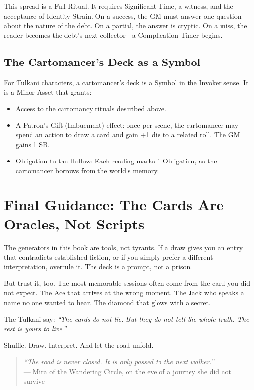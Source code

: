 \documentclass[11pt,letterpaper,twoside]{book}
\begin{document}
This spread is a Full Ritual. It requires Significant Time, a witness, and the acceptance of Identity Strain. On a success, the GM must answer one question about the nature of the debt. On a partial, the answer is cryptic. On a miss, the reader becomes the debt's next collector---a Complication Timer begins.

\subsection*{The Cartomancer's Deck as a Symbol}

For Tulkani characters, a cartomancer's deck is a Symbol in the Invoker sense. It is a Minor Asset that grants:
\begin{itemize}
    \item Access to the cartomancy rituals described above.
    \item A Patron's Gift (Imbuement) effect: once per scene, the cartomancer may spend an action to draw a card and gain +1 die to a related roll. The GM gains 1 SB.
    \item Obligation to the Hollow: Each reading marks 1 Obligation, as the cartomancer borrows from the world's memory.
\end{itemize}

\section*{Final Guidance: The Cards Are Oracles, Not Scripts}

The generators in this book are tools, not tyrants. If a draw gives you an entry that contradicts established fiction, or if you simply prefer a different interpretation, overrule it. The deck is a prompt, not a prison.

But trust it, too. The most memorable sessions often come from the card you did not expect. The Ace that arrives at the wrong moment. The Jack who speaks a name no one wanted to hear. The diamond that glows with a secret.

The Tulkani say: \textit{``The cards do not lie. But they do not tell the whole truth. The rest is yours to live.''}

Shuffle. Draw. Interpret. And let the road unfold.

\vspace{1em}
\begin{quote}
\textit{``The road is never closed. It is only passed to the next walker.''}\\
\hfill --- Mira of the Wandering Circle, on the eve of a journey she did not survive
\end{quote}
\end{document}

